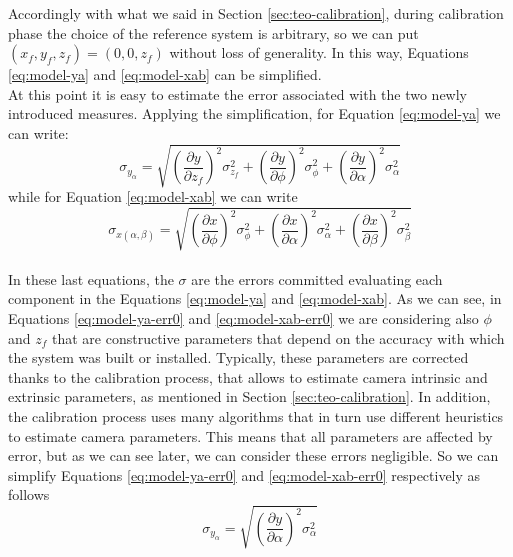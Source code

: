 Accordingly with what we said in Section \ref{sec:teo-calibration}, during calibration phase the choice of the reference system is arbitrary, so we can put $\left( x_f, y_f, z_f \right) = \left( 0, 0, z_f \right)$ without loss of generality. In this way, Equations \ref{eq:model-ya} and \ref{eq:model-xab} can be simplified. \\

At this point it is easy to estimate the error associated with the two newly introduced measures. Applying the simplification, for Equation \ref{eq:model-ya} we can write:
  \begin{equation}
    \label{eq:model-ya-err0}
    \sigma_{y_\alpha} = \sqrt{
      \left( \frac{\partial y}{\partial z_f} \right)^2 \sigma_{z_f}^2 +
      \left( \frac{\partial y}{\partial \phi} \right)^2 \sigma_\phi^2 +
      \left( \frac{\partial y}{\partial \alpha} \right)^2 \sigma_\alpha^2
    }
  \end{equation}
while for Equation \ref{eq:model-xab} we can write
  \begin{equation}
    \label{eq:model-xab-err0}
    \sigma_{x\left( \alpha, \beta \right)} = \sqrt{
      \left( \frac{\partial x}{\partial \phi} \right)^2 \sigma_\phi^2 +
      \left( \frac{\partial x}{\partial \alpha} \right)^2 \sigma_\alpha^2 +
      \left( \frac{\partial x}{\partial \beta} \right)^2 \sigma_\beta^2
    }
  \end{equation}\\
In these last equations, the $\sigma$ are the errors committed evaluating each component in the Equations \ref{eq:model-ya} and \ref{eq:model-xab}. As we can see, in Equations \ref{eq:model-ya-err0} and \ref{eq:model-xab-err0} we are considering also $\phi$ and $z_f$ that are constructive parameters that depend on the accuracy with which the system was built or installed. Typically, these parameters are corrected thanks to the calibration process, that allows to estimate camera intrinsic and extrinsic parameters, as mentioned in Section \ref{sec:teo-calibration}. In addition, the calibration process uses many algorithms that in turn use different heuristics to estimate camera parameters. This means that all parameters are affected by error, but as we can see later, we can consider these errors negligible. So we can simplify Equations \ref{eq:model-ya-err0} and \ref{eq:model-xab-err0} respectively as follows
  \begin{equation}
    \label{eq:model-ya-err1}
    \sigma_{y_\alpha} = \sqrt{
      \left( \frac{\partial y}{\partial \alpha} \right)^2 \sigma_\alpha^2
    }
  \end{equation}
  
